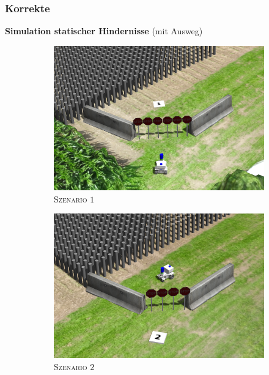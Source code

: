 \documentclass{beamer}
\begin{document}
\begin{frame}
  \frametitle{Korrekte }
  \textbf{Simulation statischer Hindernisse} (mit Ausweg)
  \begin{figure}[H]
    \centering
    \begin{subfigure}[b]{0.24\textwidth}
        \centering
        \includegraphics[width=\textwidth]{img/static_1.png}
        \caption{\textsc{Szenario $1$}}
        \label{fig:static_1}
    \end{subfigure}
    \hfill
    \begin{subfigure}[b]{0.24\textwidth}
        \centering
        \includegraphics[width=\textwidth]{img/static_2.png}
        \caption{\textsc{Szenario $2$}}
        \label{fig:static_2}
    \end{subfigure}
    \begin{subfigure}[b]{0.24\textwidth}

\end{subfigure}
\end{figure}
\end{frame}
\end{document}

